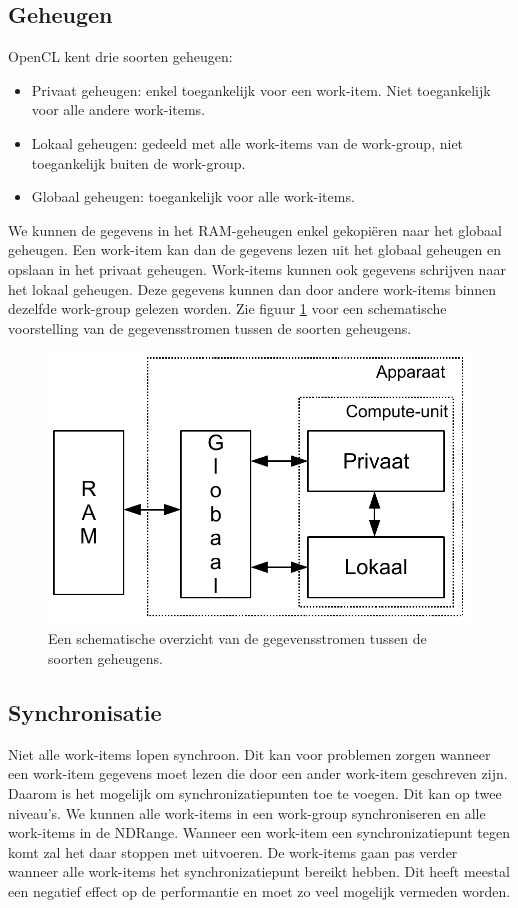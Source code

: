 \subsection{Geheugen}
\label{h:opencl:geheugen}
OpenCL kent drie soorten geheugen:
\begin{itemize}
    \item Privaat geheugen: enkel toegankelijk voor een work-item. Niet toegankelijk voor alle andere work-items.
    \item Lokaal geheugen: gedeeld met alle work-items van de work-group, niet toegankelijk buiten de work-group.
    \item Globaal geheugen: toegankelijk voor alle work-items.
\end{itemize}

We kunnen de gegevens in het RAM-geheugen enkel gekopi\"eren naar het globaal geheugen. Een work-item kan dan de gegevens lezen uit het globaal geheugen en opslaan in het privaat geheugen. Work-items kunnen ook gegevens schrijven naar het lokaal geheugen. Deze gegevens kunnen dan door andere work-items binnen dezelfde work-group gelezen worden. Zie figuur \ref{geheugenCL} voor een schematische voorstelling van de gegevensstromen tussen de soorten geheugens.

\begin{figure}[]
\centering
\includegraphics[scale=0.5]{geheugenCL}
\caption{\label{geheugenCL}Een schematische overzicht van de gegevensstromen tussen de soorten geheugens.}
\end{figure}

\subsection{Synchronisatie}
Niet alle work-items lopen synchroon. Dit kan voor problemen zorgen wanneer een work-item gegevens moet lezen die door een ander work-item geschreven zijn. Daarom is het mogelijk om synchronizatiepunten toe te voegen. Dit kan op twee niveau's. We kunnen alle work-items in een work-group synchroniseren en alle work-items in de NDRange. Wanneer een work-item een synchronizatiepunt tegen komt zal het daar stoppen met uitvoeren. De work-items gaan pas verder wanneer alle work-items het synchronizatiepunt bereikt hebben. Dit heeft meestal een negatief effect op de performantie en moet zo veel mogelijk vermeden worden.

